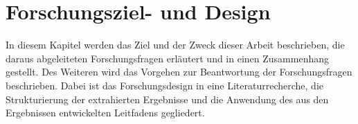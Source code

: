 \chapter{Forschungsziel- und Design}

In diesem Kapitel werden das Ziel und der Zweck dieser Arbeit beschrieben, die daraus abgeleiteten Forschungsfragen erläutert und in einen Zusammenhang gestellt. Des Weiteren wird das Vorgehen zur Beantwortung der Forschungsfragen beschrieben. Dabei ist das Forschungsdesign in eine Literaturrecherche, die Strukturierung der extrahierten Ergebnisse und die Anwendung des aus den Ergebnissen entwickelten Leitfadens gegliedert.





